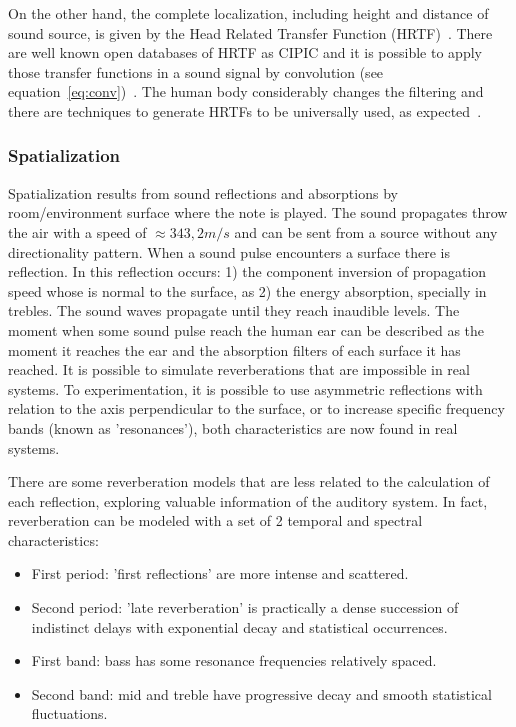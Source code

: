 \documentclass[
 aip,
 jmp,
 amsmath,amssymb,
 reprint,
]{revtex4-1}
\begin{document}
On the other hand, the complete localization, including height and distance of sound source, is given by the Head Related Transfer Function (HRTF)~\cite{hrtf}. There are well known open databases of HRTF as CIPIC and it is possible to apply those transfer functions in a sound signal by convolution (see equation~\ref{eq:conv})~\cite{CIPIC}. The human body considerably changes the filtering and there are techniques to generate HRTFs to be universally used, as expected~\cite{lazaSPA}. 

\subsubsection{Spatialization}

Spatialization results from sound reflections and absorptions by room/environment surface where the note is played. The sound propagates throw the air with a speed of $\approx 343,2m/s$ and can be sent from a source without any directionality pattern. When a sound pulse encounters a surface there is reflection. In this reflection occurs: 1) the component inversion of propagation speed whose is normal to the surface, as 2) the energy absorption, specially in trebles. The sound waves propagate until they reach inaudible levels. The moment when some sound pulse reach the human ear can be described as the moment it reaches the ear and the absorption filters of each surface it has reached. It is possible to simulate reverberations that are impossible in real systems. To experimentation, it is possible to use asymmetric reflections with relation to the axis perpendicular to the surface, or to increase specific frequency bands (known as 'resonances'), both characteristics are now found in real systems.

There are some reverberation models that are less related to the calculation of each reflection, exploring valuable information of the auditory system. In fact, reverberation can be modeled with a set of 2 temporal and spectral characteristics:

\begin{itemize}
   \item First period: 'first reflections' are more intense and scattered.
   \item Second period: 'late reverberation' is practically a dense succession of indistinct delays with exponential decay and statistical occurrences.
   \item First band: bass has some resonance frequencies relatively spaced.
   \item Second band: mid and treble have progressive decay and smooth statistical fluctuations.
\end{itemize}
\end{document}
